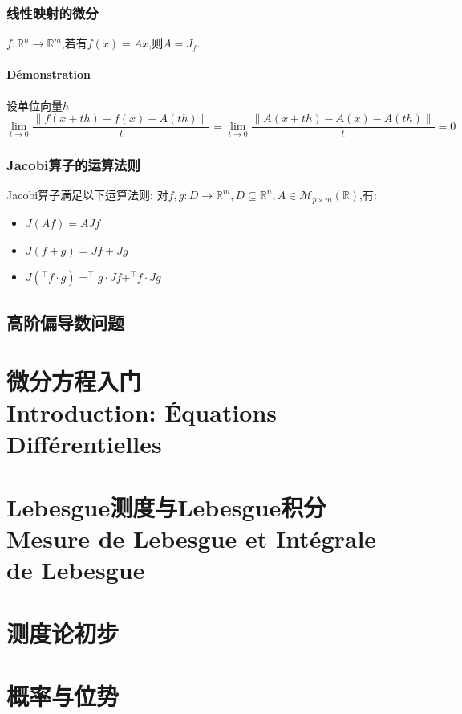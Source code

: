 \documentclass[12pt, a4paper, oneside]{ctexbook}
\begin{document}
    \subsection{线性映射的微分}
    $f:\mathbb{R}^n\rightarrow \mathbb{R}^m$,若有$f(x)=Ax$,则$A=J_f$.
    \subsubsection{Démonstration}
    设单位向量$h$
    $$
      \lim_{t \to 0}\frac{\left\lVert f(x+th)-f(x)-A(th) \right\rVert }{t}  =\lim_{t \to 0}\frac{\left\lVert A(x+th)-A(x)-A(th) \right\rVert }{t} =0 
    $$
    \subsection{Jacobi算子的运算法则}
    Jacobi算子满足以下运算法则:
    对$f,g:D\rightarrow \mathbb{R}^m, D\subseteq\mathbb{R}^n,A\in\mathcal{M}_{p\times m}(\mathbb{R})$,有:
    \begin{itemize}
      \item $J(Af)=AJf$
      \item $J(f+g)=Jf+Jg$
      \item $J(^\top f\cdot g)=^\top g\cdot Jf+^\top f\cdot Jg$
    \end{itemize}
  \section{高阶偏导数问题}
  
  
  
  
  
  
  
  
  
  
  
  
  
  \chapter{微分方程入门\\Introduction: Équations Différentielles}
  \chapter{Lebesgue测度与Lebesgue积分\\ Mesure de Lebesgue et Intégrale de Lebesgue}
  \chapter{测度论初步}
  \chapter{概率与位势}  
\end{document}
